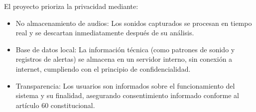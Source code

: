 El proyecto prioriza la privacidad mediante:
\begin{itemize}
  \item No almacenamiento de audios: Los sonidos capturados se procesan en tiempo real y se descartan inmediatamente después de su análisis.
  \item Base de datos local: La información técnica (como patrones de sonido y registros de alertas) se almacena en un servidor interno, sin conexión a internet, cumpliendo con el principio de confidencialidad.
  \item Transparencia: Los usuarios son informados sobre el funcionamiento del sistema y su finalidad, asegurando consentimiento informado conforme al artículo 60 constitucional.
\end{itemize}
